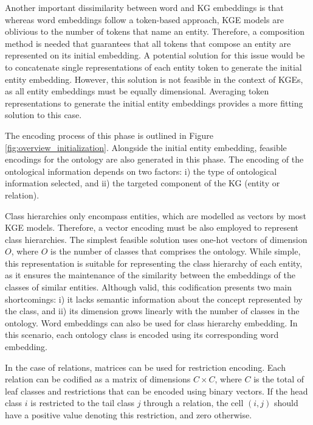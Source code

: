 Another important dissimilarity between word and KG embeddings is that whereas word embeddings follow a token-based approach, KGE models are oblivious to the number of tokens that name an entity. Therefore, a composition method is needed that guarantees that all tokens that compose an entity are represented on its initial embedding. A potential solution for this issue would be to concatenate single representations of each entity token to generate the initial entity embedding. However, this solution is not feasible in the context of KGEs, as all entity embeddings must be equally dimensional. Averaging token representations to generate the initial entity embeddings provides a more fitting solution to this case.

The encoding process of this phase is outlined in Figure \ref{fig:overview_initialization}. Alongside the initial entity embedding, feasible encodings for the ontology are also generated in this phase. The encoding of the ontological information depends on two factors: i) the type of ontological information selected, and ii) the targeted component of the KG (entity or relation). 

Class hierarchies only encompass entities, which are modelled as vectors by most KGE models. Therefore, a vector encoding must be also employed to represent class hierarchies. The simplest feasible solution uses one-hot vectors of dimension $O$, where $O$ is the number of classes that comprises the ontology. While simple, this representation is suitable for representing the class hierarchy of each entity, as it ensures the maintenance of the similarity between the embeddings of the classes of similar entities. Although valid, this codification presents two main shortcomings: i) it lacks semantic information about the concept represented by the class, and ii) its dimension grows linearly with the number of classes in the ontology. Word embeddings can also be used for class hierarchy embedding. In this scenario, each ontology class is encoded using its corresponding word embedding.

In the case of relations, matrices can be used for restriction encoding. Each relation can be codified as a matrix of dimensions $C \times C$, where $C$ is the total of leaf classes and restrictions that can be encoded using binary vectors. If the head class $i$ is restricted to the tail class $j$ through a relation, the cell $(i,j)$ should have a positive value denoting this restriction, and zero otherwise.

